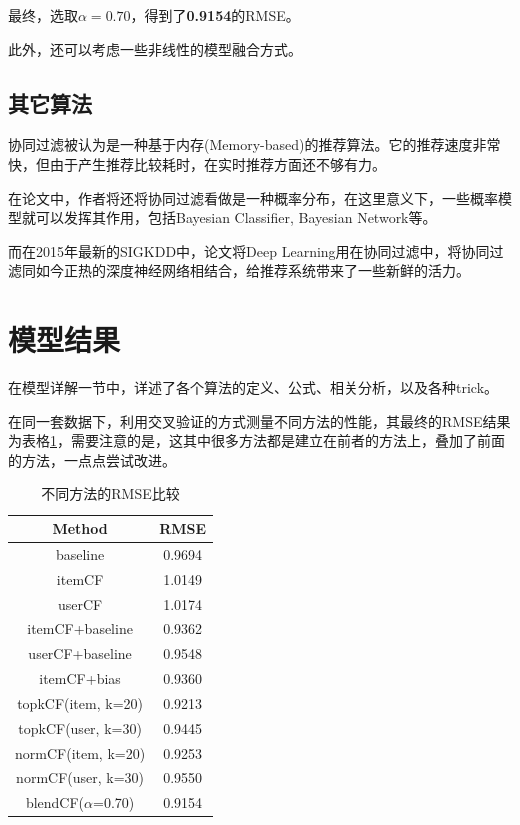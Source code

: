 \documentclass[utf8, a4paper, 11pt, onecolumn]{ctexart}
\begin{document}
\begin{spacing}{1.25}
最终，选取$\alpha = 0.70$，得到了\textbf{0.9154}的RMSE。

此外，还可以考虑一些非线性的模型融合方式。

\subsection{其它算法}

协同过滤被认为是一种基于内存(Memory-based)的推荐算法。它的推荐速度非常快，但由于产生推荐比较耗时，在实时推荐方面还不够有力。

在论文\cite{breese1998empirical}中，作者将还将协同过滤看做是一种概率分布，在这里意义下，一些概率模型就可以发挥其作用，包括Bayesian Classifier, Bayesian Network等。

而在2015年最新的SIGKDD中，论文\cite{wang2015collaborative}将Deep Learning用在协同过滤中，将协同过滤同如今正热的深度神经网络相结合，给推荐系统带来了一些新鲜的活力。

\section{模型结果}

在模型详解一节中，详述了各个算法的定义、公式、相关分析，以及各种trick。

在同一套数据下，利用交叉验证的方式测量不同方法的性能，其最终的RMSE结果为表格\ref{RMSE-table}，需要注意的是，这其中很多方法都是建立在前者的方法上，叠加了前面的方法，一点点尝试改进。

\begin{table}[hbtp]
	\centering
	\begin{tabular}{|c|c|}
		\hline
		\textbf{Method} & \textbf{RMSE} \\
		\hline
		baseline &   0.9694 \\
		\hline
		itemCF &  1.0149 \\
		\hline
		userCF & 1.0174 \\
		\hline
		itemCF+baseline &  0.9362 \\
		\hline
		userCF+baseline & 0.9548 \\
		\hline
		itemCF+bias & 0.9360 \\
		\hline
		topkCF(item, k=20) & 0.9213 \\
		\hline
		topkCF(user, k=30) &0.9445 \\
		\hline
		normCF(item, k=20) &0.9253 \\
		\hline
		normCF(user, k=30) &0.9550 \\
		\hline
		blendCF($\alpha$=0.70) & 0.9154 \\		
		\hline
	\end{tabular}
	\caption{不同方法的RMSE比较}
	\label{RMSE-table}
\end{table}


\end{spacing}
\end{document}
